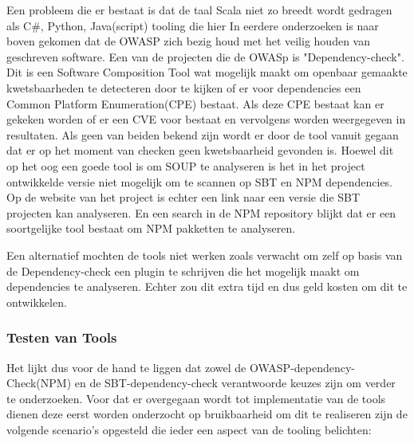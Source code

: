 Een probleem die er bestaat is dat de taal Scala niet zo breedt wordt gedragen als C#, Python, Java(script) tooling die hier
 In eerdere onderzoeken is naar boven gekomen dat de OWASP zich bezig houd met het veilig houden van geschreven software. Een van de projecten die de OWASp is "Dependency-check". Dit is een Software Composition Tool wat mogelijk maakt om openbaar gemaakte kwetsbaarheden te detecteren door te kijken of er voor dependencies een Common Platform Enumeration(CPE) bestaat. Als deze CPE bestaat kan er gekeken worden of er een CVE voor bestaat en vervolgens worden weergegeven in resultaten. Als geen van beiden bekend zijn wordt er door de tool vanuit gegaan dat er op het moment van checken geen kwetsbaarheid gevonden is. Hoewel dit op het oog een goede tool is om SOUP te analyseren is het in het project ontwikkelde versie niet mogelijk om te scannen op SBT en NPM dependencies. Op de website van het project is echter een link naar een versie die SBT projecten kan analyseren. En een search in de NPM repository blijkt dat er een soortgelijke tool bestaat om NPM pakketten te analyseren.

Een alternatief mochten de tools niet werken zoals verwacht om zelf op basis van de Dependency-check een plugin te schrijven die het mogelijk maakt om dependencies te analyseren. Echter zou dit extra tijd en dus geld kosten om dit te ontwikkelen.

%

\subsubsection{Testen van Tools}
Het lijkt dus voor de hand te liggen dat zowel de OWASP-dependency-Check(NPM) en de SBT-dependency-check verantwoorde keuzes zijn om verder te onderzoeken. Voor dat er overgegaan wordt tot implementatie van de tools dienen deze eerst worden onderzocht op bruikbaarheid om dit te realiseren zijn de volgende scenario's opgesteld die ieder een aspect van de tooling belichten:

